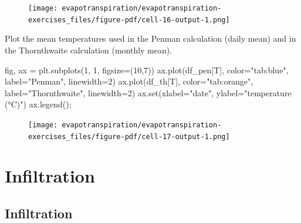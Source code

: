 \documentclass[
  letterpaper,
  DIV=11,
  numbers=noendperiod]{scrreprt}
\newenvironment{Shaded}{\begin{snugshade}}{\end{snugshade}}
\newcommand{\BuiltInTok}[1]{\textcolor[rgb]{0.00,0.23,0.31}{#1}}
\newcommand{\DecValTok}[1]{\textcolor[rgb]{0.68,0.00,0.00}{#1}}
\newcommand{\NormalTok}[1]{\textcolor[rgb]{0.00,0.23,0.31}{#1}}
\newcommand{\OperatorTok}[1]{\textcolor[rgb]{0.37,0.37,0.37}{#1}}
\newcommand{\StringTok}[1]{\textcolor[rgb]{0.13,0.47,0.30}{#1}}
\begin{document}
\begin{figure}[H]

{\centering \texttt{[image: evapotranspiration/evapotranspiration-exercises\_files/figure-pdf/cell-16-output-1.png]}

}

\end{figure}

Plot the mean temperatures used in the Penman calculation (daily mean)
and in the Thornthwaite calculation (monthly mean).

\begin{Shaded}
\begin{Highlighting}[]
\NormalTok{fig, ax }\OperatorTok{=}\NormalTok{ plt.subplots(}\DecValTok{1}\NormalTok{, }\DecValTok{1}\NormalTok{, figsize}\OperatorTok{=}\NormalTok{(}\DecValTok{10}\NormalTok{,}\DecValTok{7}\NormalTok{))}
\NormalTok{ax.plot(df\_pen[}\StringTok{\textquotesingle{}T\textquotesingle{}}\NormalTok{], color}\OperatorTok{=}\StringTok{"tab:blue"}\NormalTok{, label}\OperatorTok{=}\StringTok{"Penman"}\NormalTok{, linewidth}\OperatorTok{=}\DecValTok{2}\NormalTok{)}
\NormalTok{ax.plot(df\_th[}\StringTok{\textquotesingle{}T\textquotesingle{}}\NormalTok{], color}\OperatorTok{=}\StringTok{"tab:orange"}\NormalTok{, label}\OperatorTok{=}\StringTok{"Thornthwaite"}\NormalTok{, linewidth}\OperatorTok{=}\DecValTok{2}\NormalTok{)}
\NormalTok{ax.}\BuiltInTok{set}\NormalTok{(xlabel}\OperatorTok{=}\StringTok{"date"}\NormalTok{,}
\NormalTok{       ylabel}\OperatorTok{=}\StringTok{"temperature (°C)"}\NormalTok{)}
\NormalTok{ax.legend()}\OperatorTok{;}
\end{Highlighting}
\end{Shaded}

\begin{figure}[H]

{\centering \texttt{[image: evapotranspiration/evapotranspiration-exercises\_files/figure-pdf/cell-17-output-1.png]}

}

\end{figure}

\part{Infiltration}

\hypertarget{infiltration-2}{%
\chapter{Infiltration}\label{infiltration-2}}
\end{document}
